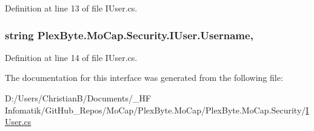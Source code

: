 Definition at line 13 of file I\+User.\+cs.

\subsubsection[{\texorpdfstring{Username}{Username}}]{\setlength{\rightskip}{0pt plus 5cm}string Plex\+Byte.\+Mo\+Cap.\+Security.\+I\+User.\+Username\hspace{0.3cm}{\ttfamily [get]}, {\ttfamily [set]}}\hypertarget{interface_plex_byte_1_1_mo_cap_1_1_security_1_1_i_user_a1e8c48f8a1f3fee58333fd586064e3fb}{}\label{interface_plex_byte_1_1_mo_cap_1_1_security_1_1_i_user_a1e8c48f8a1f3fee58333fd586064e3fb}


Definition at line 14 of file I\+User.\+cs.



The documentation for this interface was generated from the following file\+:\begin{DoxyCompactItemize}
\item 
D\+:/\+Users/\+Christian\+B/\+Documents/\+\_\+\+H\+F Infomatik/\+Git\+Hub\+\_\+\+Repos/\+Mo\+Cap/\+Plex\+Byte.\+Mo\+Cap/\+Plex\+Byte.\+Mo\+Cap.\+Security/\hyperlink{_i_user_8cs}{I\+User.\+cs}\end{DoxyCompactItemize}
